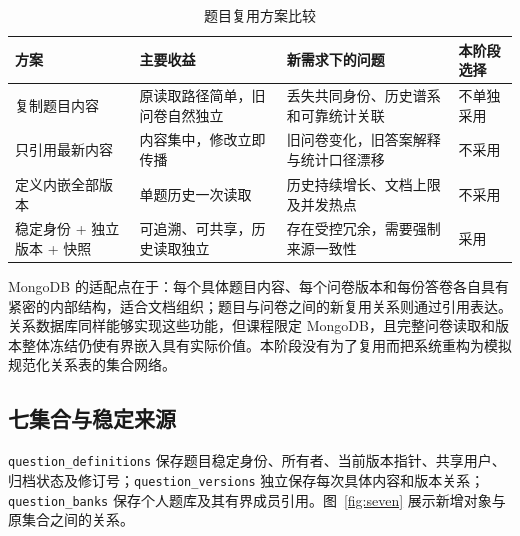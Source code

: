 \documentclass[UTF8,10pt,a4paper,twocolumn,fontset=none]{ctexart}
\begin{document}
\begin{table}[t]
\centering\small
\caption{题目复用方案比较}
\label{tab:alternatives}
\begin{tabularx}{\textwidth}{@{}p{31mm}Y Y p{23mm}@{}}
\toprule 方案 & 主要收益 & 新需求下的问题 & 本阶段选择\\\midrule
复制题目内容 & 原读取路径简单，旧问卷自然独立 & 丢失共同身份、历史谱系和可靠统计关联 & 不单独采用\\
只引用最新内容 & 内容集中，修改立即传播 & 旧问卷变化，旧答案解释与统计口径漂移 & 不采用\\
定义内嵌全部版本 & 单题历史一次读取 & 历史持续增长、文档上限及并发热点 & 不采用\\
稳定身份 + 独立版本 + 快照 & 可追溯、可共享，历史读取独立 & 存在受控冗余，需要强制来源一致性 & 采用\\\bottomrule
\end{tabularx}
\end{table}

MongoDB 的适配点在于：每个具体题目内容、每个问卷版本和每份答卷各自具有紧密的内部结构，适合文档组织；题目与问卷之间的新复用关系则通过引用表达。关系数据库同样能够实现这些功能，但课程限定 MongoDB，且完整问卷读取和版本整体冻结仍使有界嵌入具有实际价值。本阶段没有为了复用而把系统重构为模拟规范化关系表的集合网络。

\subsection{七集合与稳定来源}
\texttt{question\_definitions} 保存题目稳定身份、所有者、当前版本指针、共享用户、归档状态及修订号；\texttt{question\_versions} 独立保存每次具体内容和版本关系；\texttt{question\_banks} 保存个人题库及其有界成员引用。图~\ref{fig:seven} 展示新增对象与原集合之间的关系。
\end{document}
